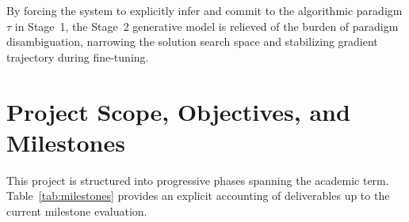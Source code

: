 \documentclass[lettersize,journal]{IEEEtran}
\begin{document}
By forcing the system to explicitly infer and commit to the algorithmic paradigm $\tau$ in Stage~1, the Stage~2 generative model is relieved of the burden of paradigm disambiguation, narrowing the solution search space and stabilizing gradient trajectory during fine-tuning.

\section{Project Scope, Objectives, and Milestones}
This project is structured into progressive phases spanning the academic term. Table~\ref{tab:milestones} provides an explicit accounting of deliverables up to the current milestone evaluation.
\end{document}
